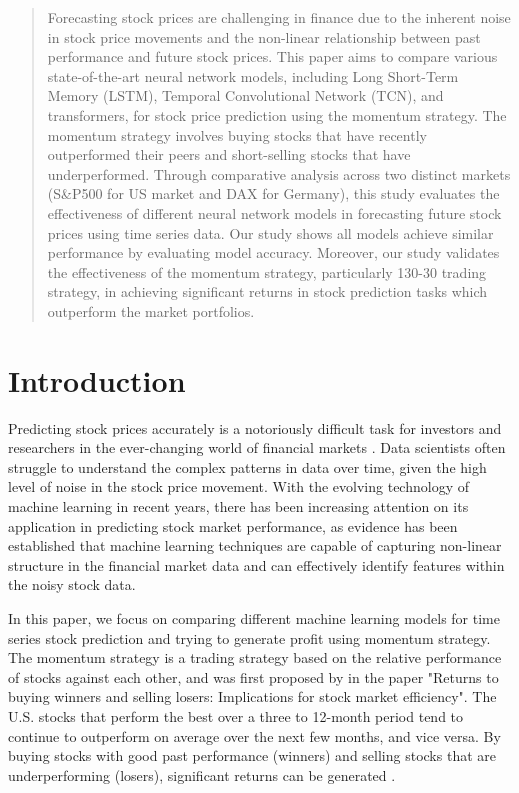 \documentclass{article}
\begin{document}
\begin{abstract}
Forecasting stock prices are challenging in finance due to the inherent noise in stock price movements and the non-linear relationship between past performance and future stock prices. This paper aims to compare various state-of-the-art neural network models, including Long Short-Term Memory (LSTM), Temporal Convolutional Network (TCN), and transformers, for stock price prediction using the momentum strategy. The momentum strategy involves buying stocks that have recently outperformed their peers and short-selling stocks that have underperformed. Through comparative analysis across two distinct markets (S\&P500 for US market and DAX for Germany), this study evaluates the effectiveness of different neural network models in forecasting future stock prices using time series data. Our study shows all models achieve similar performance by evaluating model accuracy. Moreover, our study validates the effectiveness of the momentum strategy, particularly 130-30 trading strategy, in achieving significant returns in stock prediction tasks which outperform the market portfolios. 
\end{abstract}

\section{Introduction}
Predicting stock prices accurately is a notoriously difficult task for investors and researchers in the ever-changing world of financial markets \citep{enke2005use, nti2020systematic}. Data scientists often struggle to understand the complex patterns in data over time, given the high level of noise in the stock price movement. With the evolving technology of machine learning in recent years, there has been increasing attention on its application in predicting stock market performance, as evidence has been established that machine learning techniques are capable of capturing non-linear structure in the financial market data and can effectively identify features within the noisy stock data.


In this paper, we focus on comparing different machine learning models for time series stock prediction and trying to generate profit using momentum strategy. The momentum strategy is a trading strategy based on the relative performance of stocks against each other, and was first proposed by \cite{jegadeesh1993returns} in the paper "Returns to buying winners and selling losers: Implications for stock market efficiency". The U.S. stocks that perform the best over a three to 12-month period tend to continue to outperform on average over the next few months, and vice versa. By buying stocks with good past performance (winners) and selling stocks that are underperforming (losers), significant returns can be generated \citep{takeuchi2013applying, krauss2017deep, fischer2018deep}.
\end{document}
